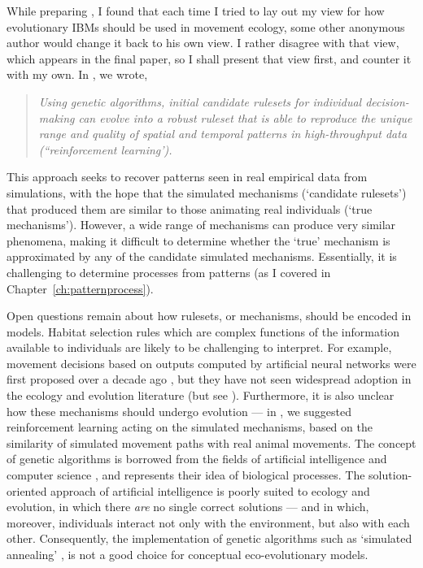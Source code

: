 While preparing \textcite{nathan2022}, I found that each time I tried to lay out my view for how evolutionary IBMs should be used in movement ecology, some other anonymous author would change it back to his own view.
I rather disagree with that view, which appears in the final paper, so I shall present that view first, and counter it with my own.
In \textcite{nathan2022}, we wrote,
\begin{quote}
    \emph{
        Using genetic algorithms, initial candidate rulesets for individual decision-making can evolve into a robust ruleset that is able to reproduce the unique range and quality of spatial and temporal patterns in high-throughput data (``reinforcement learning').
    }
\end{quote}
This approach seeks to recover patterns seen in real empirical data from simulations, with the hope that the simulated mechanisms (`candidate rulesets') that produced them are similar to those animating real individuals (`true mechanisms').
However, a wide range of mechanisms can produce very similar phenomena, making it difficult to determine whether the `true' mechanism is approximated by any of the candidate simulated mechanisms.
Essentially, it is challenging to determine processes from patterns (as I covered in Chapter~\ref{ch:patternprocess}).

Open questions remain about how rulesets, or mechanisms, should be encoded in models.
Habitat selection rules which are complex functions of the information available to individuals are likely to be challenging to interpret.
For example, movement decisions based on outputs computed by artificial neural networks were first proposed over a decade ago \parencite{mueller2011}, but they have not seen widespread adoption in the ecology and evolution literature (but see \cite{netz2021}).
Furthermore, it is also unclear how these mechanisms should undergo evolution --- in \textcite{nathan2022}, we suggested reinforcement learning acting on the simulated mechanisms, based on the similarity of simulated movement paths with real animal movements.
The concept of genetic algorithms is borrowed from the fields of artificial intelligence and computer science \parencite{deangelis2019}, and represents their idea of biological processes.
The solution-oriented approach of artificial intelligence is poorly suited to ecology and evolution, in which there \textit{are} no single correct solutions --- and in which, moreover, individuals interact not only with the environment, but also with each other.
Consequently, the implementation of genetic algorithms such as `simulated annealing' \parencite{getz2015}, is not a good choice for conceptual eco-evolutionary models.

